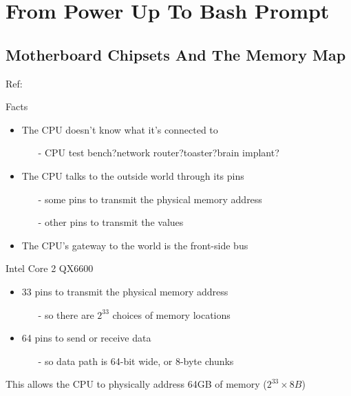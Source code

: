 \mode*
\section{From Power Up To Bash Prompt}

\subsection{Motherboard Chipsets And The Memory Map}

Ref: 

\begin{frame}
  \begin{center}
  \end{center}
\end{frame}

\begin{frame}
  \begin{block}{Facts}
    \begin{itemize}
    \item The CPU doesn't know what it's connected to
      \begin{itemize}
      \item[-] CPU test bench?\quad{}network router?\quad{}toaster?\quad{}brain implant?
      \end{itemize}
    \item The CPU talks to the outside world through its pins
      \begin{itemize}
      \item[-] some pins to transmit the physical memory address
      \item[-] other pins to transmit the values
      \end{itemize}
    \item The CPU's gateway to the world is the front-side bus
    \end{itemize}
  \end{block}
  \begin{block}{Intel Core 2 QX6600}
    \begin{itemize}
    \item 33 pins to transmit the physical memory address
      \begin{itemize}
      \item[-] so there are $2^{33}$ choices of memory locations
      \end{itemize}
    \item 64 pins to send or receive data
      \begin{itemize}
      \item[-] so data path is 64-bit wide, or 8-byte chunks
      \end{itemize}
    \end{itemize}
    This allows the CPU to physically address 64GB of memory ($2^{33}\times{}8B$)
  \end{block}
\end{frame}

